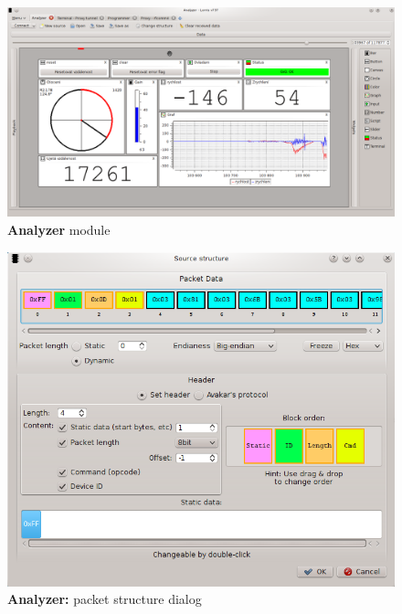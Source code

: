 \documentclass[12pt, a4paper, oneside]{article}
\newcommand{\B}{\textbf} %
\begin{document}
\begin{figure}[h]
\begin{center}
\includegraphics[width=\textwidth]{../img/analyzer_all.png}
\caption{\B{Analyzer} module}
\end{center}
\end{figure}

\begin{figure}[H]
\begin{center}
\includegraphics[scale=0.75]{../img/analyzer_struct.png}
\caption{\B{Analyzer:} packet structure dialog}
\label{Analyzer_struct}
\end{center}
\end{figure}
\end{document}
